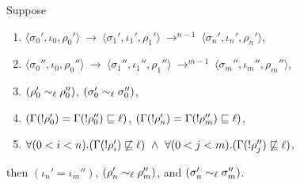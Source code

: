 \begin{myLemma}
\label{app:exc:lem:sl2}
 Suppose
\begin{enumerate}
\item $\langle \sigma_0', \iota_0, \rho_0' \rangle~\rightarrow~\langle
  \sigma_1', \iota_1', \rho_1' \rangle~\rightarrow^{n-1}~ \langle
  \sigma_n', \iota_n', \rho_n' \rangle$,
\item $\langle \sigma_0'', \iota_0, \rho_0'' \rangle~\rightarrow~
  \langle \sigma_1'', \iota_1'', \rho_1''
  \rangle~\rightarrow^{m-1}~\langle \sigma_m'', \iota_m'', \rho_m''
  \rangle $, 
\item $(\rho_0'  \sim_\ell \rho_0'')$, $(\sigma_0' \sim_\ell \sigma_0'')$, 
\item $ (\Gamma(!\rho_0')=\Gamma(!\rho_0'') \sqsubseteq \ell)$,
  $(\Gamma(!\rho_n')=\Gamma(!\rho_m'') \sqsubseteq \ell)$,
\item $\forall(0 < i < n).(\Gamma(!\rho_i') \not\sqsubseteq \ell)~\wedge~
\forall(0 < j < m).(\Gamma(!\rho_j'') \not\sqsubseteq \ell)$,
\end{enumerate}
then $(\iota_n' = \iota_m'')$, $(\rho_n' \sim_\ell \rho_m'')$, and
$(\sigma_n' \sim_\ell \sigma_m'')$. 
\end{myLemma}
